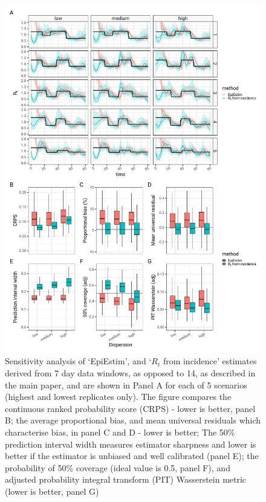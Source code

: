 \documentclass[a4paper, 12pt, twoside]{article}
\begin{document}
\begin{figure}[h!]
\centering
  \includegraphics{fig/fig5-7-day-scenario}
  \caption{Sensitivity analysis of `EpiEstim', and `$R_t$ from incidence' estimates derived from 7 day data windows, as opposed to 14, as described in the main paper, and are shown in Panel A for each of 5 scenarios (highest and lowest replicates only). The figure compares the continuous ranked probability score (CRPS) - lower is better, panel B; the average proportional bias, and mean universal residuals which characterise bias, in panel C and D - lower is better; The 50\% prediction interval width measures estimator sharpness and lower is better if the estimator is unbiased and well calibrated (panel E); the probability of 50\% coverage (ideal value is 0.5, panel F), and adjusted probability integral transform (PIT) Wasserstein metric (lower is better, panel G) }
\label{fig:S5}
\end{figure}
\end{document}
